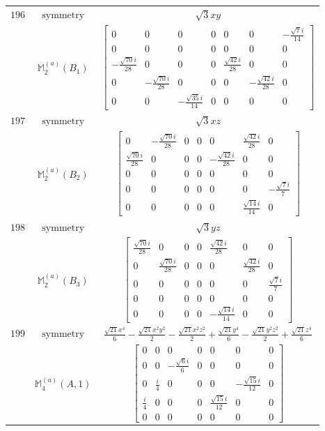 \documentclass[fleqn,8pt,landscape]{jsarticle}
\begin{document}
\begin{longtable}{ccc}
$ 196 $ & $ \text{symmetry} $ & $ \sqrt{3} x y $ \\
$  $ & $ \mathbb{M}_{2}^{(a)}(B_{1}) $ & $ \begin{bmatrix} 0 & 0 & 0 & 0 & 0 & 0 & - \frac{\sqrt{7} i}{14} \\ 0 & 0 & 0 & 0 & 0 & 0 & 0 \\ - \frac{\sqrt{70} i}{28} & 0 & 0 & 0 & \frac{\sqrt{42} i}{28} & 0 & 0 \\ 0 & - \frac{\sqrt{70} i}{28} & 0 & 0 & 0 & - \frac{\sqrt{42} i}{28} & 0 \\ 0 & 0 & - \frac{\sqrt{35} i}{14} & 0 & 0 & 0 & 0 \end{bmatrix} $ \\ \hline
$ 197 $ & $ \text{symmetry} $ & $ \sqrt{3} x z $ \\
$  $ & $ \mathbb{M}_{2}^{(a)}(B_{2}) $ & $ \begin{bmatrix} 0 & - \frac{\sqrt{70} i}{28} & 0 & 0 & 0 & \frac{\sqrt{42} i}{28} & 0 \\ \frac{\sqrt{70} i}{28} & 0 & 0 & 0 & - \frac{\sqrt{42} i}{28} & 0 & 0 \\ 0 & 0 & 0 & 0 & 0 & 0 & 0 \\ 0 & 0 & 0 & 0 & 0 & 0 & - \frac{\sqrt{7} i}{7} \\ 0 & 0 & 0 & 0 & 0 & \frac{\sqrt{14} i}{14} & 0 \end{bmatrix} $ \\ \hline
$ 198 $ & $ \text{symmetry} $ & $ \sqrt{3} y z $ \\
$  $ & $ \mathbb{M}_{2}^{(a)}(B_{3}) $ & $ \begin{bmatrix} \frac{\sqrt{70} i}{28} & 0 & 0 & 0 & \frac{\sqrt{42} i}{28} & 0 & 0 \\ 0 & \frac{\sqrt{70} i}{28} & 0 & 0 & 0 & \frac{\sqrt{42} i}{28} & 0 \\ 0 & 0 & 0 & 0 & 0 & 0 & \frac{\sqrt{7} i}{7} \\ 0 & 0 & 0 & 0 & 0 & 0 & 0 \\ 0 & 0 & 0 & 0 & - \frac{\sqrt{14} i}{14} & 0 & 0 \end{bmatrix} $ \\ \hline
$ 199 $ & $ \text{symmetry} $ & $ \frac{\sqrt{21} x^{4}}{6} - \frac{\sqrt{21} x^{2} y^{2}}{2} - \frac{\sqrt{21} x^{2} z^{2}}{2} + \frac{\sqrt{21} y^{4}}{6} - \frac{\sqrt{21} y^{2} z^{2}}{2} + \frac{\sqrt{21} z^{4}}{6} $ \\
$  $ & $ \mathbb{M}_{4}^{(a)}(A,1) $ & $ \begin{bmatrix} 0 & 0 & 0 & 0 & 0 & 0 & 0 \\ 0 & 0 & - \frac{\sqrt{6} i}{6} & 0 & 0 & 0 & 0 \\ 0 & \frac{i}{4} & 0 & 0 & 0 & - \frac{\sqrt{15} i}{12} & 0 \\ \frac{i}{4} & 0 & 0 & 0 & \frac{\sqrt{15} i}{12} & 0 & 0 \\ 0 & 0 & 0 & 0 & 0 & 0 & 0 \end{bmatrix} $ \\ \hline

\end{longtable}
\end{document}

